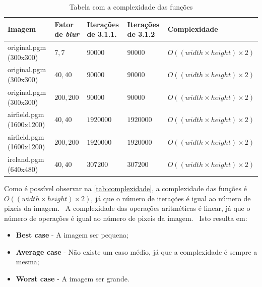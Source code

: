     \begin{table}[H]
        \centering
        \begin{tabular}{| p{23mm} | p{25mm} | p{30mm} | p{30mm} | p{38mm} |}
            \hline

            \textbf{Imagem} & \textbf{Fator de \textit{blur}} & \textbf{Iterações de 3.1.1.} & \textbf{Iterações de 3.1.2} & \textbf{Complexidade} \\ \hline

            original.pgm (300x300) & $7,7$ & $90000$ & $90000$ & $O((width \times height) \times 2)$ \\ \hline

            original.pgm (300x300) & $40,40$ & $90000$ & $90000$ & $O((width \times height) \times 2)$ \\ \hline

            original.pgm (300x300) & $200,200$ & $90000$ & $90000$ & $O((width \times height) \times 2)$ \\ \hline

            airfield.pgm (1600x1200) & $40,40$ & $1920000$ & $1920000$ & $O((width \times height) \times 2)$ \\ \hline

            airfield.pgm (1600x1200) & $200,200$ & $1920000$ & $1920000$ & $O((width \times height) \times 2)$ \\ \hline

            ireland.pgm (640x480) & $40,40$ & $307200$ & $307200$ & $O((width \times height) \times 2)$ \\ \hline
        \end{tabular}
        \caption{Tabela com a complexidade das funções}
        \label{tab:complexidade}
    \end{table}

    \newpage

    \par Como é possível observar na \autoref{tab:complexidade}, a complexidade das funções é $O((width \times height) \times 2)$, já que o número de iterações é igual ao número de pixeis da imagem. \ A complexidade das operações aritméticas é linear, já que o número de operações é igual ao número de pixeis da imagem. \ Isto resulta em:

    \begin{itemize}
        \item \textbf{Best case} - A imagem ser pequena;
        \item \textbf{Average case} - Não existe um caso médio, já que a complexidade é sempre a mesma;
        \item \textbf{Worst case} - A imagem ser grande.
    \end{itemize}

